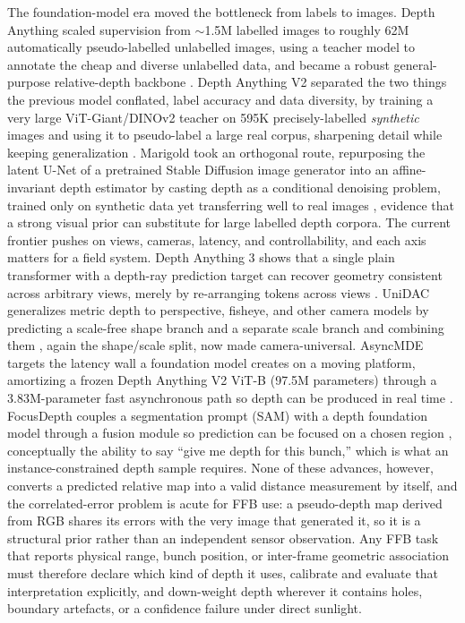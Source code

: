 The foundation-model era moved the bottleneck from labels to images. Depth Anything scaled supervision from $\sim$1.5M labelled images to roughly 62M automatically pseudo-labelled unlabelled images, using a teacher model to annotate the cheap and diverse unlabelled data, and became a robust general-purpose relative-depth backbone \cite{yang2024depthanything}. Depth Anything V2 separated the two things the previous model conflated, label accuracy and data diversity, by training a very large ViT-Giant/DINOv2 teacher on 595K precisely-labelled \emph{synthetic} images and using it to pseudo-label a large real corpus, sharpening detail while keeping generalization \cite{yang2024depthanythingv2}. Marigold took an orthogonal route, repurposing the latent U-Net of a pretrained Stable Diffusion image generator into an affine-invariant depth estimator by casting depth as a conditional denoising problem, trained only on synthetic data yet transferring well to real images \cite{ke2024marigold}, evidence that a strong visual prior can substitute for large labelled depth corpora. The current frontier pushes on views, cameras, latency, and controllability, and each axis matters for a field system. Depth Anything 3 shows that a single plain transformer with a depth-ray prediction target can recover geometry consistent across arbitrary views, merely by re-arranging tokens across views \cite{lin2025depthanything3}. UniDAC generalizes metric depth to perspective, fisheye, and other camera models by predicting a scale-free shape branch and a separate scale branch and combining them \cite{ganesan2026unidac}, again the shape/scale split, now made camera-universal. AsyncMDE targets the latency wall a foundation model creates on a moving platform, amortizing a frozen Depth Anything V2 ViT-B (97.5M parameters) through a 3.83M-parameter fast asynchronous path so depth can be produced in real time \cite{ma2026asyncmde}. FocusDepth couples a segmentation prompt (SAM) with a depth foundation model through a fusion module so prediction can be focused on a chosen region \cite{du2026focusabledepth}, conceptually the ability to say ``give me depth for this bunch,'' which is what an instance-constrained depth sample requires. None of these advances, however, converts a predicted relative map into a valid distance measurement by itself, and the correlated-error problem is acute for FFB use: a pseudo-depth map derived from RGB shares its errors with the very image that generated it, so it is a structural prior rather than an independent sensor observation. Any FFB task that reports physical range, bunch position, or inter-frame geometric association must therefore declare which kind of depth it uses, calibrate and evaluate that interpretation explicitly, and down-weight depth wherever it contains holes, boundary artefacts, or a confidence failure under direct sunlight.




